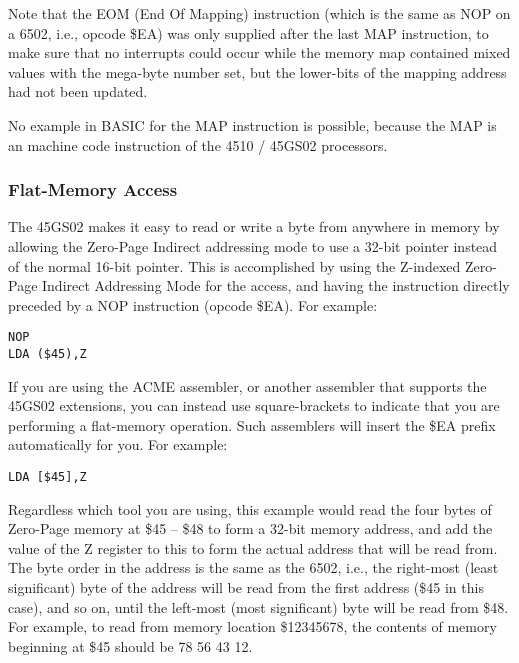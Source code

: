 Note that the EOM (End Of Mapping) instruction (which is the same as NOP on a 6502, i.e., opcode \$EA) was only supplied after the last MAP instruction, to make sure that no interrupts could occur while
the memory map contained mixed values with the mega-byte number set, but the lower-bits of the mapping address had not been
updated.

No example in BASIC for the MAP instruction is possible, because the MAP is an machine code instruction of the 4510 / 45GS02 processors.

\subsubsection{Flat-Memory Access}

The 45GS02 makes it easy to read or write a byte from anywhere in memory by allowing the Zero-Page Indirect
addressing mode to use a 32-bit pointer instead of the normal 16-bit pointer.  This is accomplished by
using the Z-indexed Zero-Page Indirect Addressing Mode for the access, and having the instruction directly
preceded by a NOP instruction (opcode \$EA).  For example:

\begin{tcolorbox}[colback=black,coltext=white]
\verbatimfont{\codefont}
\begin{verbatim}
NOP
LDA ($45),Z
\end{verbatim}
\end{tcolorbox}

If you are using the ACME assembler, or another assembler that supports the 45GS02 extensions, you can instead use square-brackets
to indicate that you are performing a flat-memory operation. Such assemblers will insert the \$EA prefix automatically for you. For example:

\begin{tcolorbox}[colback=black,coltext=white]
\verbatimfont{\codefont}
\begin{verbatim}
LDA [$45],Z
\end{verbatim}
\end{tcolorbox}

Regardless which tool you are using, this example would read the four bytes of Zero-Page memory at \$45 -- \$48 to form a 32-bit memory address, and add the value of the
Z register to this to form the actual address that will be read from.  The byte order in the address is the same as
the 6502, i.e., the right-most (least significant) byte of the address will be read from the first address (\$45 in this case),
and so on, until the left-most (most significant) byte will be read from \$48.  For example, to read from memory location
\$12345678, the contents of memory beginning at \$45 should be 78 56 43 12.

